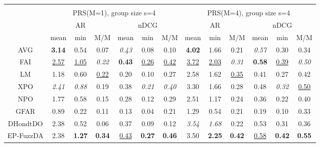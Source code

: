 \begin{tabular}{ c | c c c | c c c || c c c | c c c}
\multicolumn{12}{c}{} \\
\multicolumn{1}{c}{} & \multicolumn{6}{c}{PRS(M=1), group size s=4} & \multicolumn{6}{c}{PRS(M=4), group size s=4} \\
\multicolumn{1}{c}{} & \multicolumn{3}{c}{AR} & \multicolumn{3}{c}{nDCG} & \multicolumn{3}{c}{AR} & \multicolumn{3}{c}{nDCG} \\
& mean & min & M/M & mean & min & M/M & mean & min & M/M & mean & min & M/M \\
\hline
AVG & \textbf{3.14} & 0.54 & 0.07 & \textit{0.43} & 0.08 & 0.10 & \textbf{4.02} & 1.66 & 0.21 & \textit{0.57} & 0.30 & 0.34 \\
FAI & \underline{2.57} & \underline{1.05} & \textit{0.22} & \textbf{0.43} & \underline{0.26} & \underline{0.42} & \underline{3.72} & \underline{2.03} & \textit{0.31} & \textbf{0.58} & \underline{0.39} & \textit{0.50} \\
LM & 1.18 & 0.60 & \underline{0.22} & 0.20 & 0.10 & 0.27 & 2.58 & 1.62 & \underline{0.35} & 0.41 & 0.27 & 0.42 \\
XPO & \textit{2.41} & \textit{0.88} & 0.19 & 0.38 & \textit{0.21} & \textit{0.40} & 3.30 & 1.66 & 0.28 & 0.48 & \textit{0.32} & \underline{0.50} \\
NPO & 1.77 & 0.58 & 0.15 & 0.28 & 0.12 & 0.29 & 2.51 & 1.17 & 0.24 & 0.36 & 0.22 & 0.40 \\
GFAR & 0.89 & 0.22 & 0.11 & 0.13 & 0.04 & 0.21 & 1.29 & 0.54 & 0.21 & 0.19 & 0.10 & 0.33 \\
DHondtDO & 2.38 & 0.52 & 0.06 & 0.37 & 0.09 & 0.12 & \textit{3.54} & \textit{1.68} & 0.22 & 0.53 & 0.31 & 0.36 \\
EP-FuzzDA & 2.38 & \textbf{1.27} & \textbf{0.34} & \underline{0.43} & \textbf{0.27} & \textbf{0.46} & 3.50 & \textbf{2.25} & \textbf{0.42} & \underline{0.58} & \textbf{0.42} & \textbf{0.55} \\


\end{tabular}
